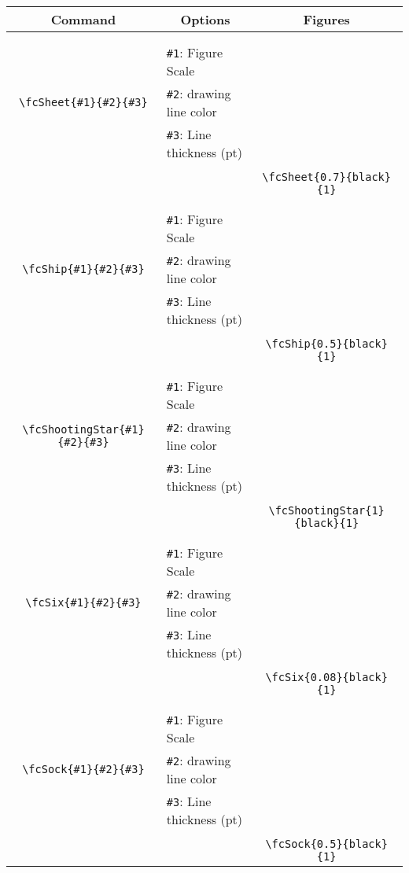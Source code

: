 \documentclass[x11names]{article}
\begin{document}
\begin{table}[H]\centering\begin{tabular}{|c|l|c|}\hline {\bf Command}& \multicolumn{1}{c|}{{\bf Options}} & {\bf Figures}\\  \hline	&&\multirow{5}{*}{\fcSheet{0.7}{black}{1}}\\	&&\\	&\verb|#1|: Figure Scale &\\	\verb|\fcSheet{#1}{#2}{#3}|&	\verb|#2|: drawing line color &\\	&\verb|#3|: Line thickness (pt) &\\ &&\\&&	\verb|\fcSheet{0.7}{black}{1}|\\\hline 	
	&&\multirow{5}{*}{\fcShip{0.5}{black}{1}}\\	&&\\	&\verb|#1|: Figure Scale &\\	\verb|\fcShip{#1}{#2}{#3}|&	\verb|#2|: drawing line color &\\	&\verb|#3|: Line thickness (pt) &\\ &&\\&&	\verb|\fcShip{0.5}{black}{1}|\\\hline 	
	&&\multirow{5}{*}{\fcShootingStar{1}{black}{1}}\\	&&\\	&\verb|#1|: Figure Scale &\\	\verb|\fcShootingStar{#1}{#2}{#3}|&	\verb|#2|: drawing line color &\\	&\verb|#3|: Line thickness (pt) &\\ &&\\&&	\verb|\fcShootingStar{1}{black}{1}|\\\hline 	
	&&\multirow{5}{*}{\fcSix{0.08}{black}{1}}\\	&&\\	&\verb|#1|: Figure Scale &\\	\verb|\fcSix{#1}{#2}{#3}|&	\verb|#2|: drawing line color &\\	&\verb|#3|: Line thickness (pt) &\\ &&\\&&	\verb|\fcSix{0.08}{black}{1}|\\\hline 	
	&&\multirow{5}{*}{\fcSock{0.5}{black}{1}}\\	&&\\	&\verb|#1|: Figure Scale &\\	\verb|\fcSock{#1}{#2}{#3}|&	\verb|#2|: drawing line color &\\	&\verb|#3|: Line thickness (pt) &\\ &&\\&&	\verb|\fcSock{0.5}{black}{1}|\\\hline 	

\end{tabular}
\end{table}
\end{document}
